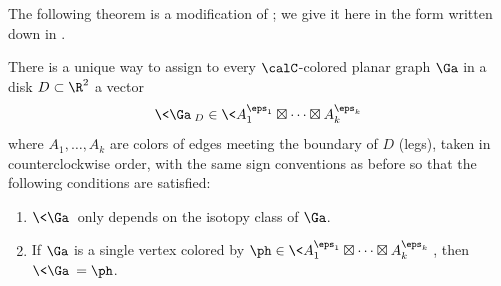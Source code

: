 The following theorem is a modification of ; we
give it here in the form written down in .
\begin{theorem}\label{t:evaluation-disk}
  There is a unique way to assign to every $\calC$-colored
  planar graph $\Ga$ in a disk $D\subset \R^2$ a vector
  \begin{equation}
    \<\Ga\>_D\in\<A_1^{\eps_1}\boxtimes\dots\boxtimes A_k^{\eps_k}\>
  \end{equation}
  where $A_1, \dots, A_k$ are colors of edges meeting the boundary
  of $D$ \textup{(}legs\textup{)}, taken in counterclockwise order, with the same sign
  conventions as before
  so that the following conditions are satisfied:
  \begin{enumerate}
     \item $\<\Ga\>$ only depends on the isotopy class of $\Ga$.

    \item If $\Ga$ is a single vertex colored by
          $\ph\in \<A_1^{\eps_1}\boxtimes\dots\boxtimes A_k^{\eps_k}\>$, then
          $\<\Ga\>=\ph$.


\end{enumerate}
\end{theorem}
